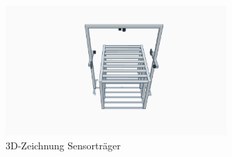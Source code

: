 \begin{figure}[htpb]
  \centering
  \includegraphics[trim={10cm 0 8cm 0}, clip, width=0.75\textwidth]{./files/Sensortraeger/Skizze_Sensor_Traeger_3D.png}
  \caption{3D-Zeichnung Sensorträger}
  \label{appendix:doku:fig:sensor_traeger_3d}
\end{figure}

